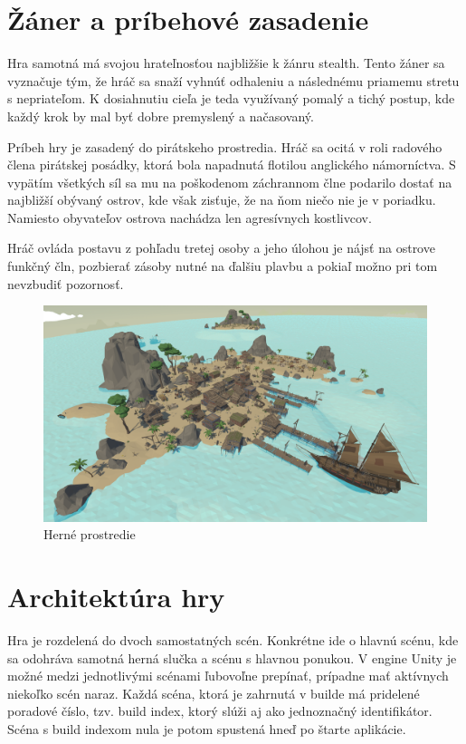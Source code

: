\documentclass[slovak, master]{diploma}
\begin{document}
\section{Žáner a príbehové zasadenie}
\label{sec:GenreAndSetting}
Hra samotná má svojou hrateľnosťou najbližšie k žánru stealth. Tento žáner sa vyznačuje tým, že hráč sa snaží vyhnúť odhaleniu a následnému priamemu stretu s nepriateľom. K dosiahnutiu cieľa je teda využívaný pomalý a tichý postup, kde každý krok by mal byť dobre premyslený a načasovaný. 

Príbeh hry je zasadený do pirátskeho prostredia. Hráč sa ocitá v roli radového člena pirátskej posádky, ktorá bola napadnutá flotilou anglického námorníctva. S vypätím všetkých síl sa mu na poškodenom záchrannom člne podarilo dostať na najbližší obývaný ostrov, kde však zisťuje, že na ňom niečo nie je v poriadku. Namiesto obyvateľov ostrova nachádza len agresívnych kostlivcov. 

Hráč ovláda postavu z pohľadu tretej osoby a jeho úlohou je nájsť na ostrove funkčný čln, pozbierať zásoby nutné na ďalšiu plavbu a pokiaľ možno pri tom nevzbudiť pozornosť.

\begin{figure}[!htbp]
    \centering
    \includegraphics[width=.9\textwidth]{Figures/game_compressed.png}
    \caption{Herné prostredie}
    \label{pic:GameScreenshot}
\end{figure}

\section{Architektúra hry}
\label{sec:GameStructure}
Hra je rozdelená do dvoch samostatných scén. Konkrétne ide o hlavnú scénu, kde sa odohráva samotná herná slučka a scénu s hlavnou ponukou. V engine Unity je možné medzi jednotlivými scénami ľubovoľne prepínať, prípadne mať aktívnych niekoľko scén naraz. Každá scéna, ktorá je zahrnutá v builde má pridelené poradové číslo, tzv. build index, ktorý slúži aj ako jednoznačný identifikátor. Scéna s build indexom nula je potom spustená hneď po štarte aplikácie.
\end{document}
